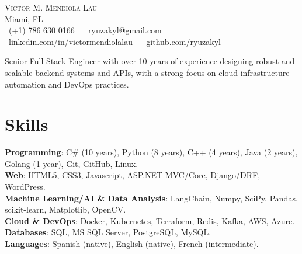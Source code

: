 \documentclass[letterpaper,11pt]{article}
\begin{document}

\begin{center}
    {\Huge \scshape Victor M. Mendiola Lau} \\ \vspace{1pt}
    Miami, FL \\ \vspace{1pt}
    \small \raisebox{-0.1\height}\faPhone\ (+1) 786 630 0166 ~ \href{mailto:ryuzakyl@gmail.com}{\raisebox{-0.2\height}\faEnvelope\  \underline{ryuzakyl@gmail.com}} ~ 
    \href{https://www.linkedin.com/in/victormendiolalau}{\raisebox{-0.2\height}\faLinkedin\ \underline{linkedin.com/in/victormendiolalau}}  ~
    \href{https://github.com/ryuzakyl}{\raisebox{-0.2\height}\faGithub\ \underline{github.com/ryuzakyl}}
    \vspace{-8pt}
\end{center}

Senior Full Stack Engineer with over 10 years of experience designing robust and scalable backend systems and APIs, with a strong focus
on cloud infrastructure automation and DevOps practices.

%

\section{Skills}
 \begin{itemize}[leftmargin=0.15in, label={}]
    \small{\item{
      \textbf{Programming}{: C\# (10 years), Python (8 years), C++ (4 years), Java (2 years), Golang (1 year), Git, GitHub, Linux.} \\
      \textbf{Web}{: HTML5, CSS3, Javascript, ASP.NET MVC/Core, Django/DRF, WordPress.} \\
      \textbf{Machine Learning/AI \& Data Analysis}{: LangChain, Numpy, SciPy, Pandas, scikit-learn, Matplotlib, OpenCV.} \\
      \textbf{Cloud \& DevOps}{: Docker, Kubernetes, Terraform, Redis, Kafka, AWS, Azure.} \\
      \textbf{Databases}{: SQL, MS SQL Server, PostgreSQL, MySQL.} \\
      \textbf{Languages}{: Spanish (native), English (native), French (intermediate).} \\
    }}
 \end{itemize}
 \vspace{-16pt}
\end{document}

